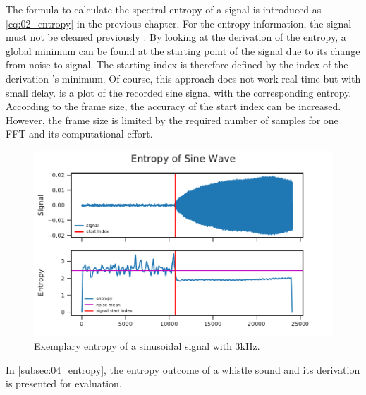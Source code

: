 The formula to calculate the spectral entropy of a signal is introduced as
\cref{eq:02_entropy} in the previous chapter.
For the entropy information, the signal must not be cleaned previously .
By looking at the derivation of the entropy, a global minimum can be found
at the starting point of the signal due to its change from noise to signal. 
The starting index is therefore defined by the index of the derivation 's minimum.
Of course, this approach does not work real-time  but with small delay.
 is a plot of the recorded sine signal with the corresponding
entropy.
According to the frame size, the accuracy of the start index can be increased.
However, the frame size is limited by the required number of samples for one \ac{FFT} and
its computational effort.
\begin{figure}[ht]
	\centering
		\includegraphics[]{figures/sine_entropy}
	\caption{Exemplary entropy of a sinusoidal signal with 3\si{\kilo\hertz}.}
	\label{fig:03_entropy}
\end{figure}
In \cref{subsec:04_entropy}, the entropy outcome of a whistle sound
and its derivation is presented for evaluation. 

